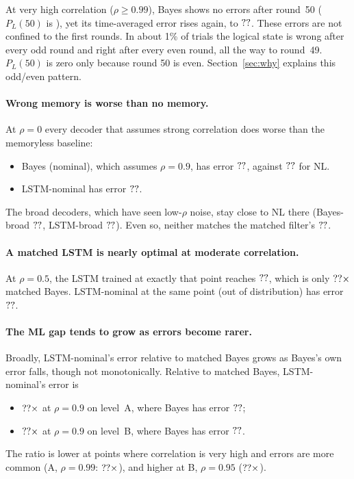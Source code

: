 At very high correlation ($\rho\ge0.99$), Bayes shows no errors after
round~50 ($P_L(50)$ is ), yet its
time-averaged error rises again, to $\res{E2}{A_rho0.99}{Bayes (matched)}$.
These errors are not confined to the first rounds. In about 1\% of trials
the logical state is wrong after every odd round and right after every even
round, all the way to round~49. $P_L(50)$ is zero only because round 50 is
even. Section~\ref{sec:why} explains this odd/even pattern.

\paragraph{Wrong memory is worse than no memory.}
At $\rho=0$ every decoder that assumes strong correlation does worse than the
memoryless baseline:
\begin{itemize}
  \item Bayes (nominal), which assumes $\rho=0.9$, has error
    $\res{E2}{A_rho0.0}{Bayes (nominal)}$, against
    $\res{E2}{A_rho0.0}{NL}$ for NL.
  \item LSTM-nominal has error $\res{E2}{A_rho0.0}{LSTM-nominal}$.
\end{itemize}
The broad decoders, which have seen low-$\rho$ noise, stay close to NL there
(Bayes-broad $\res{E2}{A_rho0.0}{Bayes-broad}$, LSTM-broad
$\res{E2}{A_rho0.0}{LSTM-broad}$). Even so, neither matches the matched
filter's $\res{E2}{A_rho0.0}{Bayes (matched)}$.

\paragraph{A matched LSTM is nearly optimal at moderate correlation.}
At $\rho=0.5$, the LSTM trained at exactly that point reaches
$\res{E2}{A_rho0.5}{LSTM-matched}$, which is only
$\resratio{E2}{A_rho0.5}{LSTM-matched}\times$ matched Bayes. LSTM-nominal at
the same point (out of distribution) has error
$\res{E2}{A_rho0.5}{LSTM-nominal}$.

\paragraph{The ML gap tends to grow as errors become rarer.}
Broadly, LSTM-nominal's error relative to matched Bayes grows as Bayes's own
error falls, though not monotonically. Relative to matched Bayes,
LSTM-nominal's error is
\begin{itemize}
  \item $\resratio{E2}{A_rho0.9}{LSTM-nominal}\times$ at $\rho=0.9$ on level~A,
    where Bayes has error $\res{E2}{A_rho0.9}{Bayes (matched)}$;
  \item $\resratio{E2}{B_rho0.9}{LSTM-nominal}\times$ at $\rho=0.9$ on level~B,
    where Bayes has error $\res{E2}{B_rho0.9}{Bayes (matched)}$.
\end{itemize}
The ratio is lower at points where correlation is very high and errors are
more common (A, $\rho=0.99$: $\resratio{E2}{A_rho0.99}{LSTM-nominal}\times$),
and higher at B, $\rho=0.95$ ($\resratio{E2}{B_rho0.95}{LSTM-nominal}\times$).

